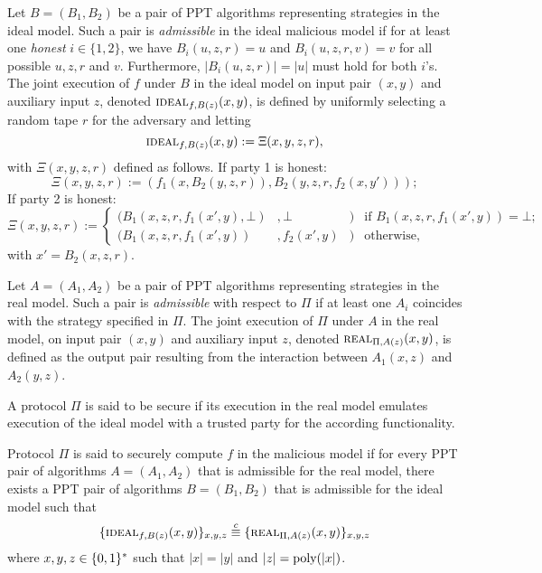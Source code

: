 \begin{definition}
Let $B=(B_1, B_2)$ be a pair of \ac{PPT} algorithms representing strategies in the ideal model.
Such a pair is \emph{admissible} in the ideal malicious model if for at least one \emph{honest} $i\in\{1,2\}$, we have $B_i(u, z, r)=u$ and $B_i(u, z, r, v)=v$ for all possible $u,z,r$ and $v$.
Furthermore, $|B_i(u, z, r)| = |u|$ must hold for both $i$'s.
The joint execution of $f$ under $B$ in the ideal model on input pair $(x, y)$ and auxiliary input $z$, denoted $\IDEAL_{f, B(z)} (x, y)$, is defined by uniformly selecting a random tape $r$ for the adversary and letting 
\[ \IDEAL_{f, B(z)} (x, y) := \Xi(x,y,z,r),\]
with $\Xi(x,y,z,r)$ defined as follows.
If party 1 is honest:
\[ \Xi(x,y,z,r) := (f_1(x,B_2(y,z,r)), B_2(y,z,r,f_2(x,y'))); \]
If party 2 is honest:
\[
 \Xi(x,y,z,r) := \left\{
 \begin{array}{lllr}
    (B_1(x, z, r, f_1(x',y), \bot)&, \bot&) &\text{if } B_1(x, z, r, f_1(x',y)) = \bot ;\\
    (B_1(x,z,r,f_1(x',y))&, f_2(x',y)&) &\text{otherwise,}
  \end{array}\right.
\]
with $x'=B_2(x,z,r)$.
\eod
\end{definition}

\begin{definition}
Let $A=(A_1, A_2)$ be a pair of \ac{PPT} algorithms representing strategies in the real model.
Such a pair is \emph{admissible} with respect to $\Pi$ if at least one $A_i$ coincides with the strategy specified in $\Pi$.
The joint execution of $\Pi$ under $A$ in the real model, on input pair $(x, y)$ and auxiliary input $z$, denoted $\REAL_{\Pi, A(z)}(x, y)$, is defined as the output pair resulting from the interaction between $A_1(x, z)$ and $A_2(y, z)$.
\eod
\end{definition}

\noindent
A protocol $\Pi$ is said to be secure if its execution in the real model emulates execution of the ideal model with a trusted party for the according functionality.

\begin{definition}
Protocol $\Pi$ is said to securely compute $f$ in the malicious model if for every \ac{PPT} pair of algorithms $A=(A_1, A_2)$ that is admissible for the real model, there exists a \ac{PPT} pair of algorithms $B=(B_1, B_2)$ that is admissible for the ideal model such that 
\[ \{\IDEAL_{f, B(z)}(x, y)\}_{x, y, z} \stackrel{c}{\equiv} \{\REAL_{\Pi, A(z)}(x, y)\}_{x, y, z} \]
where $x,y,z\in\{0,1\}^\ast$ such that $|x|=|y|$ and $|z|=\text{poly}(|x|)$.
\eod
\end{definition}


